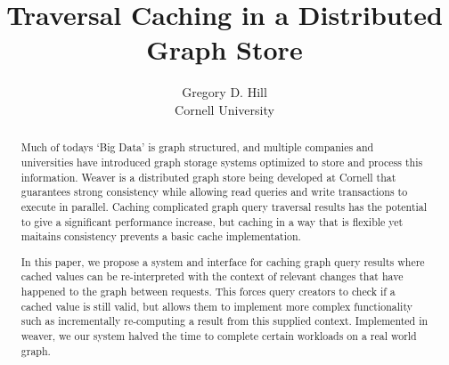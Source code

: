 \documentclass[letterpaper,twocolumn,11pt,tight]{article}
\begin{document}
\newtheorem{claim}{Claim}
\newtheorem{defn}{Definition}
\newcommand{\hilight}[1]{\colorbox{yellow}{#1}}
\newcommand{\secref}[1]{Section~\ref{sec:#1}}
\newcommand{\figref}[1]{Figure~\ref{fig:#1}}
\newcommand{\srcref}[1]{Figure~\ref{fig:#1}}
\newcommand{\clmref}[1]{Claim~\ref{claim:#1}}
\newcommand{\insertfig}[4]{\begin{figure}\centering\texttt{[image: \#2]}\caption{#3}\label{fig:#4}\end{figure}}
\newcommand{\insertsrc}[3]{\begin{figure}\centering\caption{#2}\label{fig:#3}\end{figure}}

\title{Traversal Caching in a Distributed Graph Store}

\author{\rm Gregory D. Hill \qquad
        \\Cornell University}

\maketitle
\begin{abstract}
Much of todays `Big Data' is graph structured, and multiple companies and universities have introduced graph storage systems optimized to store and process this information.
Weaver is a distributed graph store being developed at Cornell that guarantees strong consistency while allowing read queries and write transactions to execute in parallel.
Caching complicated graph query traversal results has the potential to give a significant performance increase,
but caching in a way that is flexible yet maitains consistency prevents a basic cache implementation.

In this paper, we propose a system and interface for caching graph query results where cached values can be re-interpreted with the context of relevant changes that have happened to the graph between requests.
This forces query creators to check if a cached value is still valid, but allows them to implement more complex functionality such as incrementally re-computing a result from this supplied context.
Implemented in weaver, we our system halved the time to complete certain workloads on a real world graph. %
\end{abstract}
\end{document}
